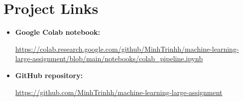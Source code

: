 \newpage
\section*{Project Links}

\begin{itemize}
  \item \textbf{Google Colab notebook:}\par
    \url{https://colab.research.google.com/github/MinhTrinhh/machine-learning-large-assignment/blob/main/notebooks/colab_pipeline.ipynb}
  \item \textbf{GitHub repository:}\par
    \url{https://github.com/MinhTrinhh/machine-learning-large-assignment}
\end{itemize}
